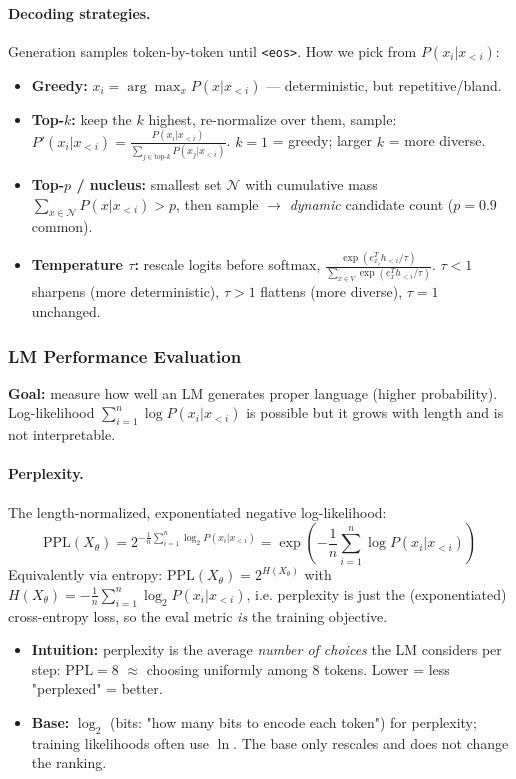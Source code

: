 \documentclass{article}
\begin{document}
\paragraph{Decoding strategies.} Generation samples token-by-token until \texttt{<eos>}. How we pick from $P(x_i|x_{<i})$:
\begin{itemize}
    \item \textbf{Greedy:} $x_i=\arg\max_x P(x|x_{<i})$ --- deterministic, but repetitive/bland.
    \item \textbf{Top-$k$:} keep the $k$ highest, re-normalize over them, sample: $P'(x_i|x_{<i})=\frac{P(x_i|x_{<i})}{\sum_{j\in\text{top-}k}P(x_j|x_{<i})}$. $k{=}1$ = greedy; larger $k$ = more diverse.
    \item \textbf{Top-$p$ / nucleus:} smallest set $\mathcal{N}$ with cumulative mass $\sum_{x\in\mathcal{N}}P(x|x_{<i})>p$, then sample $\rightarrow$ \textit{dynamic} candidate count ($p{=}0.9$ common).
    \item \textbf{Temperature $\tau$:} rescale logits before softmax, $\frac{\exp(e_{x_i}^T h_{<i}/\tau)}{\sum_{x\in V}\exp(e_x^T h_{<i}/\tau)}$. $\tau{<}1$ sharpens (more deterministic), $\tau{>}1$ flattens (more diverse), $\tau{=}1$ unchanged.
\end{itemize}

\subsubsection{LM Performance Evaluation}
\textbf{Goal:} measure how well an LM generates proper language (higher probability). Log-likelihood $\sum_{i=1}^n \log P(x_i|x_{<i})$ is possible but it grows with length and is not interpretable.

\paragraph{Perplexity.} The length-normalized, exponentiated negative log-likelihood:
$$
\text{PPL}(X_\theta) = 2^{-\frac{1}{n}\sum_{i=1}^n \log_2 P(x_i|x_{<i})} = \exp\!\left(-\frac{1}{n}\sum_{i=1}^n \log P(x_i|x_{<i})\right)
$$
Equivalently via entropy: $\text{PPL}(X_\theta)=2^{H(X_\theta)}$ with $H(X_\theta)=-\frac{1}{n}\sum_{i=1}^n \log_2 P(x_i|x_{<i})$, i.e. perplexity is just the (exponentiated) cross-entropy loss, so the eval metric \textit{is} the training objective.

\begin{itemize}
    \item \textbf{Intuition:} perplexity is the average \textit{number of choices} the LM considers per step: $\text{PPL}=8$ $\approx$ choosing uniformly among 8 tokens. Lower = less "perplexed" = better.
    \item \textbf{Base:} $\log_2$ (bits: "how many bits to encode each token") for perplexity; training likelihoods often use $\ln$. The base only rescales and does not change the ranking.
\end{itemize}
\end{document}
